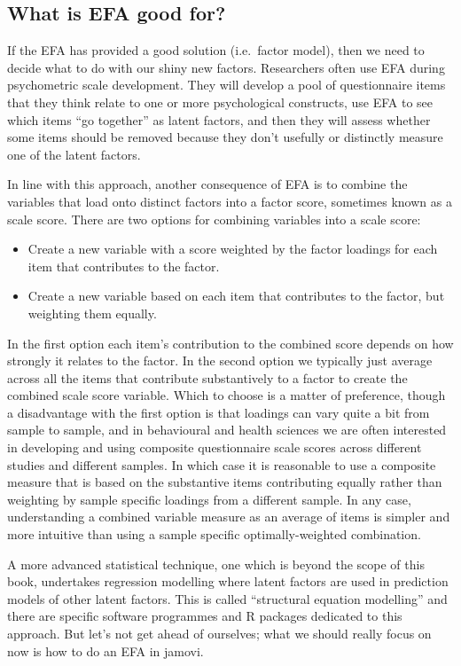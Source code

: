 \documentclass[
]{book}
\providecommand{\tightlist}{%
  \setlength{\itemsep}{0pt}\setlength{\parskip}{0pt}}
\begin{document}
\hypertarget{what-is-efa-good-for}{%
\subsection{What is EFA good for?}\label{what-is-efa-good-for}}

If the EFA has provided a good solution (i.e.~factor model), then we need to decide what to do with our shiny new factors. Researchers often use EFA during psychometric scale development. They will develop a pool of questionnaire items that they think relate to one or more psychological constructs, use EFA to see which items ``go together'' as latent factors, and then they will assess whether some items should be removed because they don't usefully or distinctly measure one of the latent factors.

In line with this approach, another consequence of EFA is to combine the variables that load onto distinct factors into a factor score, sometimes known as a scale score. There are two options for combining variables into a scale score:

\begin{itemize}
\tightlist
\item
  Create a new variable with a score weighted by the factor loadings for each item that contributes to the factor.
\item
  Create a new variable based on each item that contributes to the factor, but weighting them equally.
\end{itemize}

In the first option each item's contribution to the combined score depends on how strongly it relates to the factor. In the second option we typically just average across all the items that contribute substantively to a factor to create the combined scale score variable. Which to choose is a matter of preference, though a disadvantage with the first option is that loadings can vary quite a bit from sample to sample, and in behavioural and health sciences we are often interested in developing and using composite questionnaire scale scores across different studies and different samples. In which case it is reasonable to use a composite measure that is based on the substantive items contributing equally rather than weighting by sample specific loadings from a different sample. In any case, understanding a combined variable measure as an average of items is simpler and more intuitive than using a sample specific optimally-weighted combination.

A more advanced statistical technique, one which is beyond the scope of this book, undertakes regression modelling where latent factors are used in prediction models of other latent factors. This is called ``structural equation modelling'' and there are specific software programmes and R packages dedicated to this approach. But let's not get ahead of ourselves; what we should really focus on now is how to do an EFA in jamovi.
\end{document}
